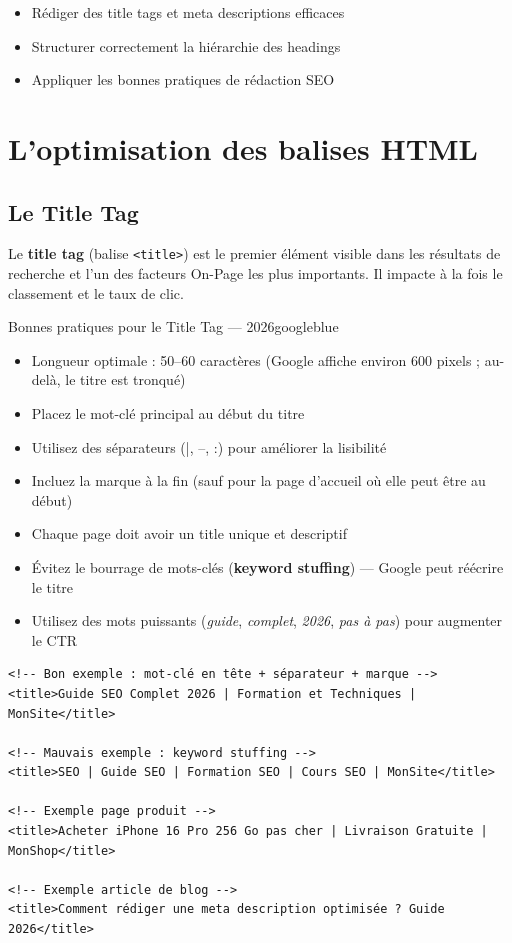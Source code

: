 \documentclass[12pt,a4paper,twoside]{report}
\newcommand{\keyword}[1]{\textbf{\textcolor{googleblue}{#1}}}
\newcommand{\important}[1]{\textbf{\textcolor{googlered}{#1}}}
\newcommand{\level}[1]{\medskip\bigskip}
\begin{document}
\level{1}
\begin{objectives}
\begin{itemize}
    \item Rédiger des title tags et meta descriptions efficaces
    \item Structurer correctement la hiérarchie des headings
    \item Appliquer les bonnes pratiques de rédaction SEO
\end{itemize}
\end{objectives}

\chapter{L'optimisation des balises HTML}
\label{ch:html}

\section{Le Title Tag}

Le \keyword{title tag} (balise \texttt{<title>}) est le premier élément visible dans les résultats de recherche et l'un des facteurs On-Page les plus importants. Il impacte à la fois le classement et le taux de clic.

\begin{mybox}{Bonnes pratiques pour le Title Tag --- 2026}{googleblue}
\begin{itemize}
    \item Longueur optimale : 50--60 caractères (Google affiche environ 600 pixels ; au-delà, le titre est tronqué)
    \item Placez le mot-clé principal au début du titre
    \item Utilisez des séparateurs (|, --, :) pour améliorer la lisibilité
    \item Incluez la marque à la fin (sauf pour la page d'accueil où elle peut être au début)
    \item Chaque page doit avoir un title unique et descriptif
    \item Évitez le bourrage de mots-clés (\important{keyword stuffing}) --- Google peut réécrire le titre
    \item Utilisez des mots puissants (\textit{guide}, \textit{complet}, \textit{2026}, \textit{pas à pas}) pour augmenter le CTR
\end{itemize}
\end{mybox}

\begin{lstlisting}[style=htmlcode,caption={Exemples de Title Tags optimisés en 2026}]
<!-- Bon exemple : mot-clé en tête + séparateur + marque -->
<title>Guide SEO Complet 2026 | Formation et Techniques | MonSite</title>

<!-- Mauvais exemple : keyword stuffing -->
<title>SEO | Guide SEO | Formation SEO | Cours SEO | MonSite</title>

<!-- Exemple page produit -->
<title>Acheter iPhone 16 Pro 256 Go pas cher | Livraison Gratuite | MonShop</title>

<!-- Exemple article de blog -->
<title>Comment rédiger une meta description optimisée ? Guide 2026</title>
\end{lstlisting}
\end{document}
